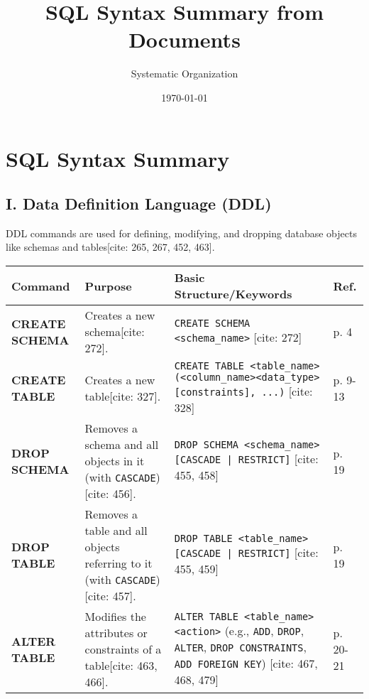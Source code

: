 \documentclass[12pt,a4paper]{article}
\title{SQL Syntax Summary from Documents}
\author{Systematic Organization}
\date{\today}
\begin{document}
\maketitle

\section*{SQL Syntax Summary}

\subsection*{I. Data Definition Language (DDL)}
DDL commands are used for defining, modifying, and dropping database objects like schemas and tables[cite: 265, 267, 452, 463].

\begin{longtable}{>{\bfseries}p{} p{} p{} p{}}
\toprule
\textbf{Command} & \textbf{Purpose} & \textbf{Basic Structure/Keywords} & \textbf{Ref.} \\
\midrule
\endhead
\textbf{CREATE SCHEMA} & Creates a new schema[cite: 272]. & \texttt{CREATE SCHEMA \textless schema\_name\textgreater} [cite: 272] & p. 4 \\
\textbf{CREATE TABLE} & Creates a new table[cite: 327]. & \texttt{CREATE TABLE \textless table\_name\textgreater (\textless column\_name\textgreater \textless data\_type\textgreater [constraints], ...)} [cite: 328] & p. 9-13 \\
\textbf{DROP SCHEMA} & Removes a schema and all objects in it (with \texttt{CASCADE})[cite: 456]. & \texttt{DROP SCHEMA \textless schema\_name\textgreater [CASCADE | RESTRICT]} [cite: 455, 458] & p. 19 \\
\textbf{DROP TABLE} & Removes a table and all objects referring to it (with \texttt{CASCADE})[cite: 457]. & \texttt{DROP TABLE \textless table\_name\textgreater [CASCADE | RESTRICT]} [cite: 455, 459] & p. 19 \\
\textbf{ALTER TABLE} & Modifies the attributes or constraints of a table[cite: 463, 466]. & \texttt{ALTER TABLE \textless table\_name\textgreater \textless action\textgreater} (e.g., \texttt{ADD}, \texttt{DROP}, \texttt{ALTER}, \texttt{DROP CONSTRAINTS}, \texttt{ADD FOREIGN KEY}) [cite: 467, 468, 479] & p. 20-21 \\
\bottomrule
\end{longtable}

\vspace{0.5cm}
\end{document}
